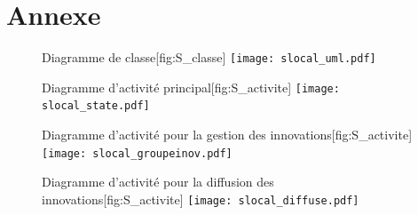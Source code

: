 \section{Annexe}
\label{sec:annexe}

\begin{figure}[!htbp]
\begin{sidecaption}{Diagramme de classe}[fig:S_classe]
  \centering
 \texttt{[image: slocal\_uml.pdf]}
  \end{sidecaption}
\end{figure}

\begin{figure}[!htbp]
\begin{sidecaption}{Diagramme d'activité principal}[fig:S_activite]
  \centering
 \texttt{[image: slocal\_state.pdf]}
  \end{sidecaption}
\end{figure}

\begin{figure}[!htbp]
\begin{sidecaption}{Diagramme d'activité pour la gestion des innovations}[fig:S_activite]
  \centering
 \texttt{[image: slocal\_groupeinov.pdf]}
  \end{sidecaption}
\end{figure}

\begin{figure}[!htbp]
\begin{sidecaption}{Diagramme d'activité pour la diffusion des innovations}[fig:S_activite]
  \centering
 \texttt{[image: slocal\_diffuse.pdf]}
  \end{sidecaption}
\end{figure}

\printbibliography[heading=subbibliography]


